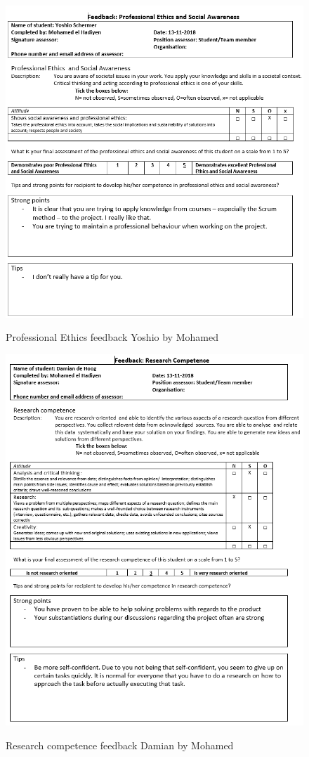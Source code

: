 \documentclass[12pt]{article}
\begin{document}
	\begin{figure}[p!]
		\centering
		\includegraphics[width=\columnwidth]{ProfEthYoshio1.PNG}\\
		\caption{Professional Ethics feedback Yoshio by Mohamed}
	\end{figure}
	\begin{figure}[p!]
		\centering
		\includegraphics[width=\columnwidth]{ResSklDamian1.PNG}\\
		\caption{Research competence feedback Damian by Mohamed}
	\end{figure}
\end{document}
